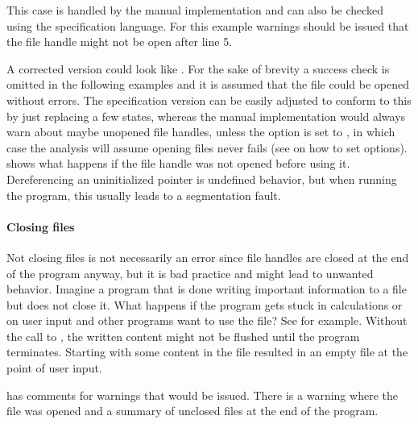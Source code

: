 This case is handled by the manual implementation and can also be checked using the specification language. For this example warnings should be issued that the file handle might not be open after line 5.

A corrected version could look like .
For the sake of brevity a success check is omitted in the following examples and it is assumed that the file could be opened without errors. The specification version can be easily adjusted to conform to this by just replacing a few states, whereas the manual implementation would always warn about maybe unopened file handles, unless the option  is set to , in which case the analysis will assume opening files never fails (see  on how to set options).
 shows what happens if the file handle was not opened before using it. Dereferencing an uninitialized pointer is undefined behavior, but when running the program, this usually leads to a segmentation fault.

\paragraph*{Closing files}
Not closing files is not necessarily an error since file handles are closed at the end of the program anyway, but it is bad practice and might lead to unwanted behavior.
Imagine a program that is done writing important information to a file but does not close it. What happens if the program gets stuck in calculations or on user input and other programs want to use the file? See  for example. Without the call to , the written content might not be flushed until the program terminates. Starting with some content in the file resulted in an empty file at the point of user input.

 has comments for warnings that would be issued. There is a warning where the file was opened and a summary of unclosed files at the end of the program.

